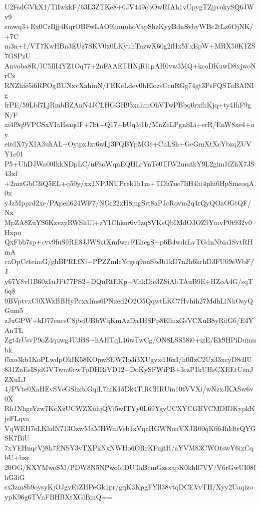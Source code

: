 U2FsdGVkX1/TiIwkkF/63L3ZTKe8+0JV449cbOwRIAh1vUpygTZjjvokySQ6JWv9
smwq3+Ex0CzBjj4KqrOBFwLAO9lmuuhoVapShzKyyBdnSvbyWBc2tLz6OjNK/+7C
m3n+1/VT7KwHBn3EUz7SKV0x0LKyuhTnzwX60g2iHx5FxEpW+MRX50K1ZS7GSPzU
Anvoba8R/IC5IlI4YZ1Oq77+2nFAAETHNjRl1pAH0vw3MQ+kcoDKuwD8xjwoNrCz
RNZhfe5i6RPOgBUNxvXahinN/FEKeLdev0hElozsCcuRGg74gt3PsFQSToBAlNIg
frPE/59Lbf7LjRmbBZAnN4JCLHGGH93xahmOhVTwPBbq0rxfhKjq+ty4IhF9gN/F
ai4f9q9VPCSxVIaHsaqdF+7bt+Q17+bUq3j1b/MnZeLPgnSLi+erR/EnW8xe4+oy
eirdX7yXIA3uhAL+OyipxJzr6wLj3FQBYpMGe+CuLSh+GeGmXtXcYbzqZUVY1c01
P5+UhDJWa00IkkNDpLC/uFaoWqnEQHLrYnTe0TIW2mutkY9L2gim1fZhX7JS43xf
+2mxGbC3iQ5EL+q50y/xx1NPJNUPrek1h1m+TDh7ue7IiH4hi4phi6HpSmeoqA0x
yJzMpprd2xe/PApeil624WF7/NGr22xH8mgSrt8aPJcRovm2q4rQyQOaOGtQF/Nx
MpZA8ZuYS6KzvzyRWShUl+zY1Chkor6v9zq8VKsQbIMdO3OZ9YmvP0t932v0Hxpu
QxFbb7sp+cvv9fuS9RE8JJWSctXmfwecFEhcgS+p6B4wdcLvTGdnNbia1SvtRHmA
caOpCeteimG/ghBPRLfNf+PPZZmlcYcgsq9ouSb3b1kD7n2h6krhD3FU69sWbF/J
y67Y8vl1B60z1uJFt77PS2+DQnRtEKp+VhkDic3ZSiAbTAuB9E+HZoA4G/sqT6q8
9BVptvxC0XWzBBHyPexxIms6PNxed2O2O5QqwtLKC7Hvhih27MdhLiNkOsyQGum5
zJxGPW+kD77encsC8jbdUBbWqKmAzDa1HSPp8ElhizGsVCXuB8yRiiG6/E4YAnTL
Zgt4rUsvP9oZ4quwgJU3BS+hAHTqL46wTwCg/ON8LSS58i0+izE/Ek9HPiDumubk
f5xo3kb1KoPLwdpOkIK58KOpwSEW7lo3i3XUgvxdJ6xI/h0fIzC2Uz33xcyD8dIU
831ZnEsISjdGVTwm0ewTpDHRiVD12+DoKySFWiPB+3rzP1kUHsCXEEtUznJZXuLJ
4/PVte0XaHEvSVeGShzblGqlL7hfK15Dk4TlRCHRUin10tVVXi/wNzxJKASw6v0X
Rh1NhgeVzw7KcXzUCWZXuhjQVi5wITYy0L69YgvUCXYCGHVCMDIDKypkKjeFLqva
VqWEH7eLKhdN713OzwMaMHWniVsb1xVqcHGWNoaVXJR00qK664hldtrQYGSK7BiU
7xYEHnqcVj8h7ENSY3vTXPkNxNWHo6ORrKFujtH/aYVM83CWOtswY6ixCqbU+bxe
20OG/KXYMweSM/PDW8N5NPwoIdDUTaBcmGzsxapK0khll7VV/V6rGwUI08fhG3iG
sx3zm8b9oysyKjOJgvEtZHPeGk1pr/gqK3KpgFYll38vtqDCEVvTH/Xyy2Uaqizo
ypK96g6TVnFBHBXtXGlBmQ==
